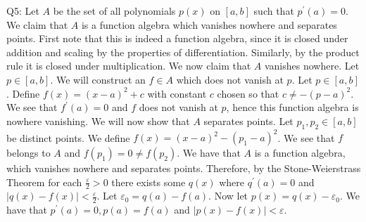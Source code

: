 \documentclass[letterpaper]{article}
\begin{document}
\noindent Q5: Let $A$ be the set of all polynomials $p(x)$ on $[a,b]$ such that $p^\prime(a) =0$. We claim that $A$ is a function algebra which vanishes nowhere and separates points. 
First note that this is indeed a function algebra, since it is closed under addition and scaling by the properties of differentiation. Similarly, by the product rule it is closed under multiplication. We now claim that $A$ vanishes nowhere. Let $p\in [a,b]$. We will construct an $f\in A$ which does not vanish at $p$. Let $p \in [a,b]$. Define $f(x) = (x-a)^2+c$ with constant $c$ chosen so that $c\neq - (p-a)^2$. We see that $f^\prime(a) = 0$ and $f$ does not vanish at $p$, hence this function algebra is nowhere vanishing. We will now show that $A$ separates points. Let $p_1,p_2 \in [a,b]$ be distinct points. We define $f(x) = (x-a)^2-(p_1-a)^2$. We see that $f$ belongs to $A$ and $f(p_1)=0 \neq f(p_2)$. We have that $A$ is a function algebra, which vanishes nowhere and separates points. Therefore, by the Stone-Weierstrass Theorem for each $\frac{\varepsilon}{2}>0$ there exists some $q(x)$ where $q^\prime(a)=0$ and $|q(x)-f(x)|<\frac{\varepsilon}{2}$. Let $\varepsilon_0 = q(a)-f(a)$. Now let $p(x) = q(x)-\varepsilon_0$. We have that $p^\prime(a)=0,p(a)=f(a)$ and $|p(x)-f(x)|<\varepsilon$.
\end{document}
